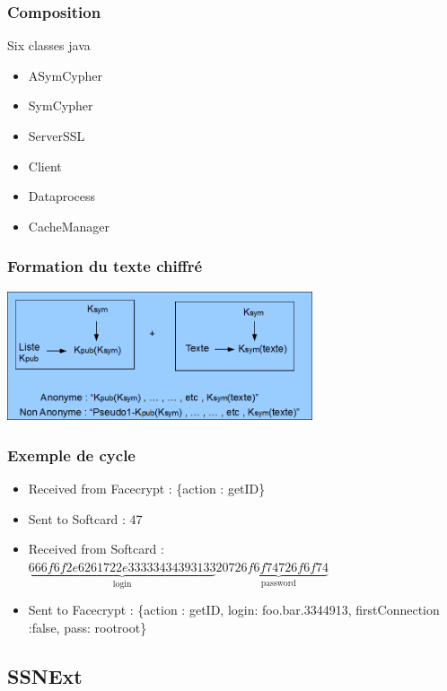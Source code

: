 \documentclass{beamer}
\begin{document}
\begin{frame}
    \frametitle{Composition}
    \begin{block}{Six classes java}
        \begin{itemize}
            \item ASymCypher
            \item SymCypher
            \item ServerSSL
            \item Client
            \item Dataprocess
            \item CacheManager
        \end{itemize}
    \end{block}
\end{frame}

\begin{frame}
\frametitle{Formation du texte chiffré}
\begin{center}
\includegraphics[width=9cm]{schema_dolby_2}
\end{center}
\end{frame}

\begin{frame}
    \frametitle{Exemple de cycle}

    \begin{itemize}
        \item Received from Facecrypt : \{\og action \fg{}: \og getID\fg{}\}
        \item Sent to Softcard : 47
        \item Received from Softcard : $\underbrace{666f6f2e6261722e33333434393133}_{\textrm{login}} 20 \underbrace{726f6f74726f6f74}_{\textrm{password}}$
        \item Sent to Facecrypt : \{\og action\fg{} : \og{} getID\fg{}, \og login\fg{}: \og foo.bar.3344913\fg{}, \og{}firstConnection \fg{}:false, \og pass\fg{}: \og rootroot\fg{}\}
    \end{itemize}
\end{frame}

\subsection{SSNExt}
\end{document}
